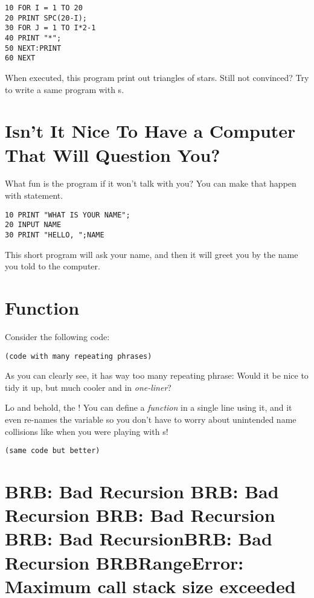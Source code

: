 \begin{lstlisting}
10 FOR I = 1 TO 20
20 PRINT SPC(20-I);
30 FOR J = 1 TO I*2-1
40 PRINT "*";
50 NEXT:PRINT
60 NEXT
\end{lstlisting}

When executed, this program print out triangles of stars. Still not convinced? Try to write a same program with s.

\section[Get User INPUT]{Isn't It Nice To Have a Computer That Will Question You?}

What fun is the program if it won't talk with you? You can make that happen with  statement.

\begin{lstlisting}
10 PRINT "WHAT IS YOUR NAME";
20 INPUT NAME
30 PRINT "HELLO, ";NAME
\end{lstlisting}

This short program will ask your name, and then it will greet you by the name you told to the computer.

\section[Function]{Function}

Consider the following code:

\begin{lstlisting}
(code with many repeating phrases)
\end{lstlisting}

As you can clearly see, it has way too many repeating phrase:  Would it be nice to tidy it up, but much cooler and in \emph{one-liner}?

Lo and behold, the ! You can define a \emph{function} in a single line using it, and it even re-names the variable so you don't have to worry about unintended name collisions like when you were playing with s!

\begin{lstlisting}
(same code but better)
\end{lstlisting}


\section[Recursion]{BRB: Bad Recursion BRB: Bad Recursion BRB: Bad Recursion BRB: Bad RecursionBRB: Bad Recursion BRBRangeError: Maximum call stack size exceeded}

